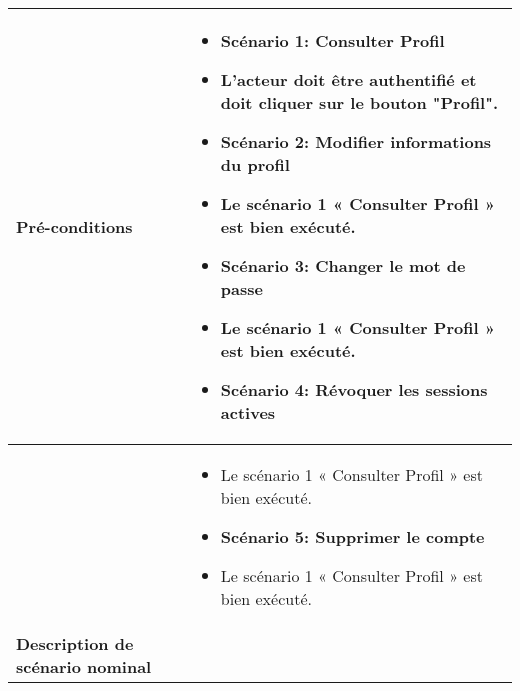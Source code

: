 \begin{longtable}{|>{\arraybackslash}p{4.2cm}|>{\arraybackslash}p{12.5cm}|}
\hline
\textbf{Pré-conditions} &
\begin{itemize}[label=]
  \item\textbf{Scénario 1: Consulter Profil}
  \item L'acteur doit être authentifié et doit cliquer sur le bouton "Profil".
  \item\textbf{Scénario 2: Modifier informations du profil}
  \item Le scénario 1 « Consulter Profil » est bien exécuté.
  \item\textbf{Scénario 3: Changer le mot de passe}
   \item Le scénario 1 « Consulter Profil » est bien exécuté.
  \item\textbf{Scénario 4: Révoquer les sessions actives}

\end{itemize}\\

\hline
\textbf{}&
\begin{itemize}[label=]
    \item Le scénario 1 « Consulter Profil » est bien exécuté.
   \item\textbf{Scénario 5: Supprimer le compte}
\item Le scénario 1 « Consulter Profil » est bien exécuté.
\end{itemize}\\
\hline
\textbf{Description de scénario nominal }  &
\begin{itemize}[label=]


\end{itemize}
\end{longtable}
